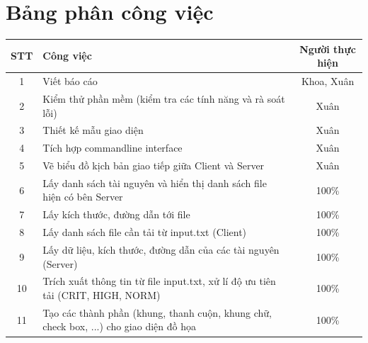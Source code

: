 \documentclass[a4paper,12pt]{report}
\begin{document}
\section{Bảng phân công việc}
\begin{center}
  \renewcommand{\arraystretch}{1.5}
  \begin{tabular}{|c|p{}|c|}
    \hline
    \textbf{STT} & \textbf{Công việc}                                                                                         & \textbf{Người thực hiện} \\\hline
    1            & Viết báo cáo                                                                             & Khoa, Xuân               \\\hline
    2            & Kiểm thử phần mềm (kiểm tra các tính năng và rà soát lỗi)                                     & Xuân               \\\hline
    3            & Thiết kế mẫu giao diện                                                                         & Xuân               \\\hline
    4            & Tích hợp commandline interface                                                                & Xuân               \\\hline
    5            & Vẽ biểu đồ kịch bản giao tiếp giữa Client và Server                                                & Xuân               \\\hline
    6            & Lấy danh sách tài nguyên và hiển thị danh sách file hiện có bên Server       & 100\%             \\\hline
    7            & Lấy kích thước, đường dẫn tới file                                                                       & 100\%             \\\hline
    8            & Lấy danh sách file cần tải từ input.txt (Client)                                             & 100\%             \\\hline
    9            & Lấy dữ liệu, kích thước, đường dẫn của các tài nguyên (Server)                                       & 100\%             \\\hline
    10           & Trích xuất thông tin từ file input.txt, xử lí độ ưu tiên tải (CRIT, HIGH, NORM)                                                     & 100\%             \\\hline
    11           & Tạo các thành phần (khung, thanh cuộn, khung chữ, check box, ...) cho giao diện đồ họa                               & 100\%             \\\hline

\end{tabular}
\end{center}
\end{document}
